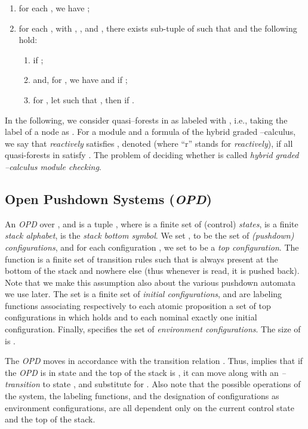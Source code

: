 \documentclass{LMCS}
\theoremstyle{plain}
\def \OPD           {\emph{OPD}\xspace}
\begin{document}
\begin{enumerate}[]
\item
for each , we have ;

\item
for each , with , , and , there exists  sub-tuple of 
such that  and the following hold:

\begin{enumerate}[]
\item
 if ;

\item
 and, for , we have  and  if ;

\item
for , let  such that , then  if .
\end{enumerate}
\end{enumerate}
In the following, we consider quasi--forests in  as labeled with
, i.e., taking the label of a node  as
. For a module  and a formula  of the hybrid graded
--calculus, we say that  \emph{reactively} satisfies ,
denoted  (where ``r'' stands for \emph{reactively}), if all
quasi-forests in  satisfy . The problem of deciding whether
 is called \emph{hybrid graded --calculus module
checking}.

\subsection{Open Pushdown Systems
(\OPD)}\label{sub:OpenPushdownSystems} An \OPD over
,  and 
is a tuple , where  is a finite set of (control)
\emph{states},  is a finite \emph{stack alphabet},
 is the \emph{stack bottom symbol}. We
set ,  to be the set of \emph{(pushdown) configurations},
and for each configuration , we set  to be a \emph{top configuration}. The
function  is a finite set of transition rules such that
 is always present at the bottom of the stack and nowhere
else (thus whenever  is read, it is pushed back). Note
that we make this assumption also about the various pushdown
automata we use later. The set  is a finite
set of \emph{initial configurations},  and  are labeling
functions associating respectively to each atomic proposition 
a set of top configurations in which  holds and to each nominal
exactly one initial configuration. Finally,  specifies the set of \emph{environment
configurations}. The size  of  is .

The \OPD moves in accordance with the transition relation
. Thus,  implies that if the \OPD is in state  and the
top of the stack is , it can move along with an
\emph{--transition} to state , and substitute 
for . Also note that the possible operations of the system, the
labeling functions, and the designation of configurations as
environment configurations, are all dependent only on the current
control state and the top of the stack.
\end{document}
